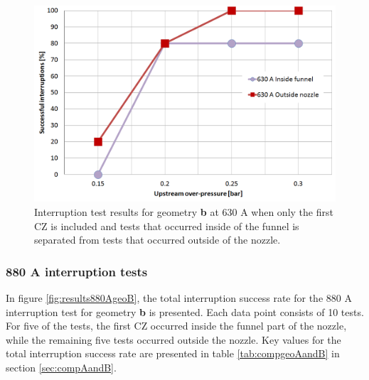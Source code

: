 \documentclass[10pt,b5paper,twoside]{article}
\begin{document}
\begin{figure}[H]
\centering
\includegraphics[scale=0.45]{Bilder/Results/geoB630ampcomp.PNG}
\caption{Interruption test results for geometry \textbf{b} at 630 A when only the first CZ is included and tests that occurred inside of the funnel is separated from tests that occurred outside of the nozzle.} \label{fig:results630AgeoBcomp}
\end{figure}

\subsubsection*{880 A interruption tests}

In figure \ref{fig:results880AgeoB}, the total interruption success rate for the 880 A interruption test for geometry \textbf{b} is presented. Each data point consists of 10 tests. For five of the tests, the first CZ occurred inside the funnel part of the nozzle, while the remaining five tests occurred outside the nozzle. Key values for the total interruption success rate are presented in table \ref{tab:compgeoAandB} in section \ref{sec:compAandB}. 
\end{document}
